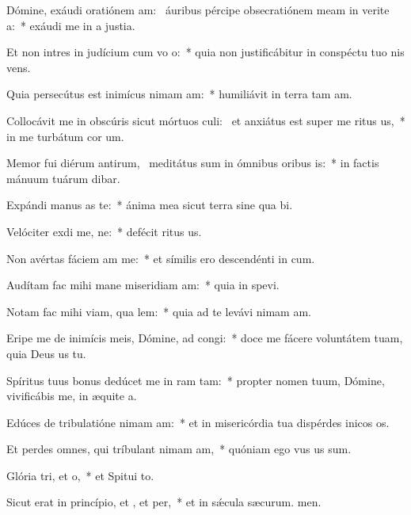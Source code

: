 \item Dómine, exáudi oratiónem am:~\pscross{} áuribus pércipe obsecratiónem meam in verite a:~* exáudi me in a justia.
\item Et non intres in judícium cum vo o:~* quia non justificábitur in conspéctu tuo nis vens.
\item Quia persecútus est inimícus nimam am:~* humiliávit in terra tam am.
\item Collocávit me in obscúris sicut mórtuos culi:~\pscross{} et anxiátus est super me ritus us,~* in me turbátum  cor um.
\item Memor fui diérum antirum,~\pscross{} meditátus sum in ómnibus oribus is:~* in factis mánuum tuárum dibar.
\item Expándi manus as  te:~* ánima mea sicut terra sine qua bi.
\item Velóciter exdi me, ne:~* defécit ritus us.
\item Non avértas fáciem am  me:~* et símilis ero descendénti in cum.
\item Audítam fac mihi mane miseridiam am:~* quia in  spevi.
\item Notam fac mihi viam,  qua lem:~* quia ad te levávi nimam am.
\item Eripe me de inimícis meis, Dómine, ad  congi:~* doce me fácere voluntátem tuam, quia Deus us  tu.
\item Spíritus tuus bonus dedúcet me in ram tam:~* propter nomen tuum, Dómine, vivificábis me, in æquite a.
\item Edúces de tribulatióne nimam am:~* et in misericórdia tua dispérdes inicos os.
\item Et perdes omnes, qui tríbulant nimam am,~* quóniam ego vus us sum.
\item Glória tri, et o,~* et Spitui to.
\item Sicut erat in princípio, et , et per,~* et in sǽcula sæcurum. men.
